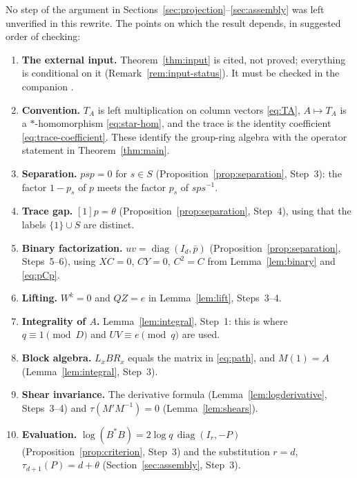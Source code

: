 \documentclass[11pt]{article}
\theoremstyle{remark}
\numberwithin{equation}{section}
\newcommand{\diag}{\operatorname{diag}}
\begin{document}
No step of the argument in Sections~\ref{sec:projection}--\ref{sec:assembly} was left unverified in this rewrite. The points on which the result depends, in suggested order of checking:

\begin{enumerate}[leftmargin=2.2em]
\item \textbf{The external input.} Theorem~\ref{thm:input} is cited, not proved; everything is conditional on it (Remark~\ref{rem:input-status}). It must be checked in the companion \cite{CharacteristicTwo}.
\item \textbf{Convention.} $T_A$ is left multiplication on column vectors \eqref{eq:TA}, $A\mapsto T_A$ is a $*$-homomorphism \eqref{eq:star-hom}, and the trace is the identity coefficient \eqref{eq:trace-coefficient}. These identify the group-ring algebra with the operator statement in Theorem~\ref{thm:main}.
\item \textbf{Separation.} $psp=0$ for $s\in S$ (Proposition~\ref{prop:separation}, Step~3): the factor $1-p_s$ of $p$ meets the factor $p_s$ of $sps^{-1}$.
\item \textbf{Trace gap.} $[1]p=\theta$ (Proposition~\ref{prop:separation}, Step~4), using that the labels $\{1\}\cup S$ are distinct.
\item \textbf{Binary factorization.} $uv=\diag(I_d,\bar p)$ (Proposition~\ref{prop:separation}, Steps~5--6), using $XC=0$, $CY=0$, $C^2=C$ from Lemma~\ref{lem:binary} and \eqref{eq:pCp}.
\item \textbf{Lifting.} $W^k=0$ and $QZ=e$ in Lemma~\ref{lem:lift}, Steps~3--4.
\item \textbf{Integrality of $A$.} Lemma~\ref{lem:integral}, Step~1: this is where $q\equiv1\pmod D$ and $UV\equiv e\pmod q$ are used.
\item \textbf{Block algebra.} $L_xBR_x$ equals the matrix in \eqref{eq:path}, and $M(1)=A$ (Lemma~\ref{lem:integral}, Step~3).
\item \textbf{Shear invariance.} The derivative formula (Lemma~\ref{lem:logderivative}, Steps~3--4) and $\tau(M'M^{-1})=0$ (Lemma~\ref{lem:shears}).
\item \textbf{Evaluation.} $\log(B^*B)=2\log q\,\diag(I_r,-P)$ (Proposition~\ref{prop:criterion}, Step~3) and the substitution $r=d$, $\tau_{d+1}(P)=d+\theta$ (Section~\ref{sec:assembly}, Step~3).
\end{enumerate}

\begingroup
\raggedright


\endgroup
\end{document}
